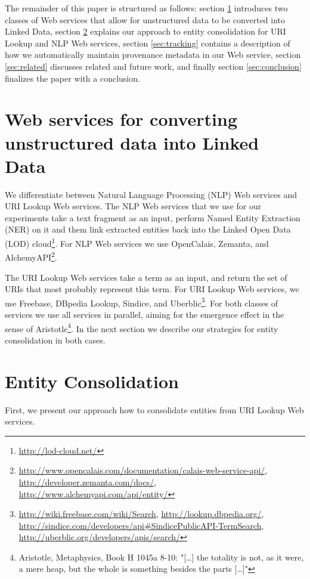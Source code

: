 \documentclass{acm_proc_article-sp}
\begin{document}
The remainder of this paper is structured as follows: section \ref{sec:services} introduces two classes of Web services that allow for unstructured data to be converted into Linked Data, section \ref{sec:consolidation} explains our approach to entity consolidation for URI Lookup and NLP Web services, section \ref{sec:tracking} contains a description of how we automatically maintain provenance metadata in our Web service, section \ref{sec:related} discusses related and future work, and finally section \ref{sec:conclusion} finalizes the paper with a conclusion.

\section{Web services for converting unstructured data into Linked Data}\label{sec:services}
We differentiate between Natural Language Processing (NLP) Web services and URI Lookup Web services. The NLP Web services that we use for our experiments take a text fragment as an input, perform Named Entity Extraction (NER) on it and them link extracted entities back into the Linked Open Data (LOD) cloud\footnote{\url{http://lod-cloud.net/}}. For NLP Web services we use OpenCalais, Zemanta, and AlchemyAPI\footnote{\url{http://www.opencalais.com/documentation/calais-web-service-api/}, \url{http://developer.zemanta.com/docs/}, \url{http://www.alchemyapi.com/api/entity/}}.

The URI Lookup Web services take a term as an input, and return the set of URIs that most probably represent this term. For URI Lookup Web services, we use Freebase, DBpedia Lookup, Sindice, and Uberblic\footnote{\url{http://wiki.freebase.com/wiki/Search}, \url{http://lookup.dbpedia.org/}, \url{http://sindice.com/developers/api#SindicePublicAPI-TermSearch}, \url{http://uberblic.org/developers/apis/search/}}. For both classes of services we use all services in parallel, aiming for the emergence effect in the sense of Aristotle\footnote{Aristotle, Metaphysics, Book H 1045a 8-10: "[\ldots] the totality is not, as it were, a mere heap, but the whole is something besides the parts [\ldots]"}. In the next section we describe our strategies for entity consolidation in both cases. 

\section{Entity Consolidation}\label{sec:consolidation}
First, we present our approach how to consolidate entities from URI Lookup Web services.
\end{document}
